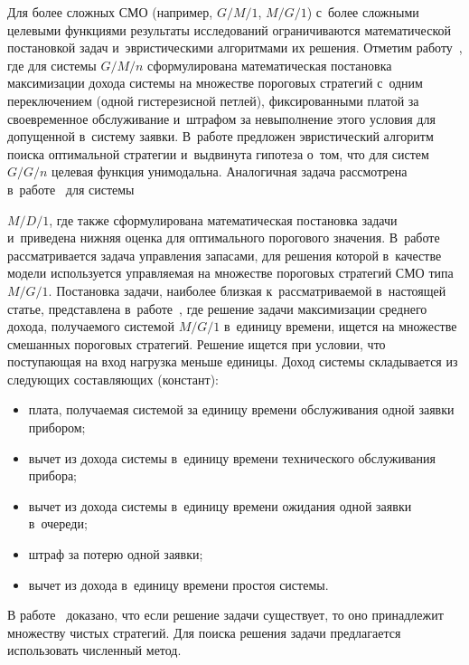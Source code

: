 \begin{multicols}{2}
Для более 
сложных СМО (например, $G/M/1$, $M/G/1$) с~более сложными целевыми 
функциями результаты исследований ограничиваются математической 
постановкой задач и~эвристическими алгоритмами их решения. 
%
Отметим 
работу~\cite{4-ag}, где для системы $G/M/n$ сформулирована математическая 
постановка максимизации дохода системы на множестве пороговых стратегий 
с~одним переключением (одной гистерезисной петлей), фиксированными 
платой за своевременное обслуживание и~штрафом за невыполнение этого 
условия для допущенной в~систему заявки. В~работе предложен эвристический 
алгоритм поиска оптимальной стратегии и~выдвинута гипотеза о~том, что для 
систем $G/G/n$ целевая функция унимодальна. 
%
Аналогичная задача 
рассмотрена в~работе~\cite{5-ag} для системы\linebreak\vspace*{-12pt}

\pagebreak

\noindent
 $M/D/1$, где также 
сформулирована математическая постановка задачи и~приведена нижняя 
оценка для оптимального порогового значения. 
%
В~работе~\cite{6-ag} 
рассматривается задача управления запасами, для решения которой в~качестве 
модели используется управляемая на множестве пороговых стратегий СМО 
типа $M/G/1$. 
%
Постановка задачи, наиболее близкая к~рас\-смат\-ри\-ва\-емой 
в~настоящей статье, представлена в~работе~\cite{7-ag}, где решение задачи 
максимизации среднего дохода, получаемого системой $M/G/1$ в~единицу 
времени, ищется на множестве смешанных пороговых стратегий. Решение 
ищется при условии, что поступающая на вход нагрузка меньше единицы. 
Доход системы складывается из следующих составляющих (констант):
  \begin{itemize}
\item плата, получаемая системой за единицу времени обслуживания одной 
заявки прибором;
\item вычет из дохода системы в~единицу времени технического 
обслуживания прибора;
\item вычет из дохода системы в~единицу времени ожидания одной заявки 
в~очереди;
\item штраф за потерю одной заявки;
\item вычет из дохода в~единицу времени простоя системы. 
\end{itemize}

  В работе~\cite{7-ag} доказано, что если решение задачи существует, то оно 
принадлежит множеству чистых стратегий. Для поиска решения задачи 
предлагается использовать численный метод.
  

\end{multicols}
